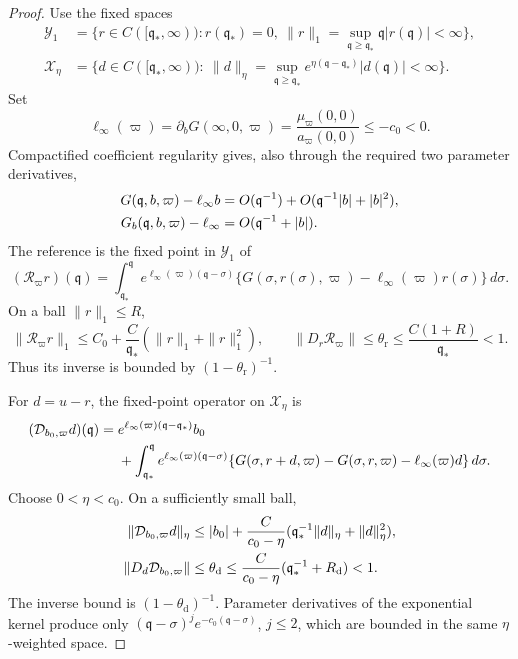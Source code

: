 \documentclass[11pt]{amsart}
\numberwithin{equation}{section}
\theoremstyle{definition}
\theoremstyle{remark}
\begin{document}
\begin{proof}
Use the fixed spaces
\begin{align*}
 \mathcal Y_1&=\{r\in C([\mathfrak q_*,\infty)):
  r(\mathfrak q_*)=0,
  \ \|r\|_1=\sup_{\mathfrak q\ge\mathfrak q_*}
       \mathfrak q|r(\mathfrak q)|<\infty\},\\
 \mathcal X_\eta&=\{d\in C([\mathfrak q_*,\infty)):
  \ \|d\|_\eta=\sup_{\mathfrak q\ge\mathfrak q_*}
  e^{\eta(\mathfrak q-\mathfrak q_*)}|d(\mathfrak q)|<\infty\}.
\end{align*}
Set
\[
 \ell_\infty(\varpi)=\partial_bG(\infty,0,\varpi)
 =\frac{\mu_\varpi(0,0)}{a_\varpi(0,0)}\le-c_0<0.
\]
Compactified coefficient regularity gives, also through the required two
parameter derivatives,
\begin{align}
 G(\mathfrak q,b,\varpi)-\ell_\infty b
 &=O(\mathfrak q^{-1})
   +O(\mathfrak q^{-1}|b|+|b|^2),\notag\\
 G_b(\mathfrak q,b,\varpi)-\ell_\infty
 &=O(\mathfrak q^{-1}+|b|).
 \label{eq:app-alg-G-bounds}
\end{align}
The reference is the fixed point in $\mathcal Y_1$ of
\begin{equation}\label{eq:app-alg-reference-volterra}
 (\mathcal R_\varpi r)(\mathfrak q)
 =\int_{\mathfrak q_*}^{\mathfrak q}
 e^{\ell_\infty(\varpi)(\mathfrak q-\sigma)}
 \{G(\sigma,r(\sigma),\varpi)
       -\ell_\infty(\varpi)r(\sigma)\}\,d\sigma.
\end{equation}
On a ball $\|r\|_1\le R$,
\begin{equation}\label{eq:app-alg-reference-contraction}
 \|\mathcal R_\varpi r\|_1
 \le C_0+\frac C{\mathfrak q_*}(\|r\|_1+\|r\|_1^2),
 \qquad
 \|D_r\mathcal R_\varpi\|
 \le\theta_{\mathrm r}
 \le\frac{C(1+R)}{\mathfrak q_*}<1.
\end{equation}
Thus its inverse is bounded by $(1-\theta_{\mathrm r})^{-1}$.

For $d=u-r$, the fixed-point operator on $\mathcal X_\eta$ is
\begin{align}
 (\mathcal D_{b_0,\varpi}d)(\mathfrak q)
 ={}&e^{\ell_\infty(\varpi)(\mathfrak q-\mathfrak q_*)}b_0\notag\\
 &+\int_{\mathfrak q_*}^{\mathfrak q}
 e^{\ell_\infty(\varpi)(\mathfrak q-\sigma)}
 \{G(\sigma,r+d,\varpi)-G(\sigma,r,\varpi)
       -\ell_\infty(\varpi)d\}\,d\sigma.
 \label{eq:app-alg-difference-volterra}
\end{align}
Choose $0<\eta<c_0$.  On a sufficiently small ball,
\begin{align}
 \|\mathcal D_{b_0,\varpi}d\|_\eta
 &\le |b_0|+\frac C{c_0-\eta}
   (\mathfrak q_*^{-1}\|d\|_\eta+\|d\|_\eta^2),\notag\\
 \|D_d\mathcal D_{b_0,\varpi}\|
 &\le\theta_{\mathrm d}
 \le\frac C{c_0-\eta}(\mathfrak q_*^{-1}+R_{\mathrm d})<1.
 \label{eq:app-alg-difference-contraction}
\end{align}
The inverse bound is $(1-\theta_{\mathrm d})^{-1}$.  Parameter derivatives
of the exponential kernel produce only
$(\mathfrak q-\sigma)^je^{-c_0(\mathfrak q-\sigma)}$, $j\le2$, which are
bounded in the same $\eta$-weighted space.


\end{proof}
\end{document}
